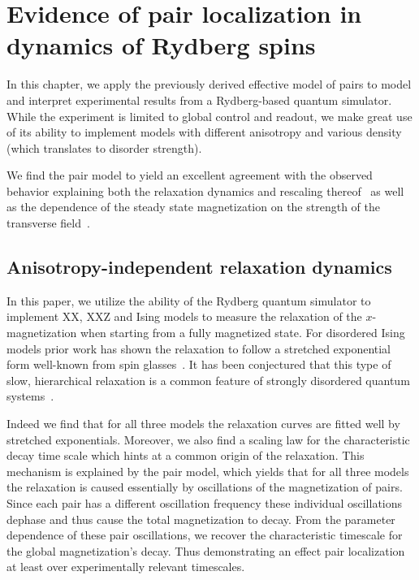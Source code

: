 \chapter{Evidence of pair localization in dynamics of Rydberg spins}

In this chapter, we apply the previously derived effective model of pairs to model and interpret experimental results from a Rydberg-based quantum simulator. While the experiment is limited to global control and readout, we make great use of its ability to implement models with different anisotropy and various density (which translates to disorder strength).

We find the pair model to yield  an excellent agreement with the observed behavior explaining both the relaxation dynamics and rescaling thereof~\cite{franzObservationUniversalRelaxation2023} as well as the dependence of the steady state magnetization on the strength of the transverse field~\cite{franzEmergentPairLocalization2022}.


\section{Anisotropy-independent relaxation dynamics}
In this paper, we utilize the ability of the Rydberg quantum simulator to implement XX, XXZ and Ising models to measure the relaxation of the $x$-magnetization when starting from a fully magnetized state. For disordered Ising models prior work has shown the relaxation to follow a stretched exponential form well-known from spin glasses~\cite{breyStretchedExponentialDecay1993,signolesGlassyDynamicsDisordered2021,schultzenGlassyQuantumDynamics2022,schultzenSemiclassicalSimulationsPredict2022}. It has been conjectured that this type of slow, hierarchical relaxation is a common feature of strongly disordered quantum systems~\cite{haldarSlowDynamicsKohlrausch2023}.

Indeed we find that for all three models the relaxation curves are fitted well by stretched exponentials. Moreover, we also find a scaling law for the characteristic decay time scale which hints at a common origin of the relaxation. This mechanism is explained by the pair model, which yields that for all three models the relaxation is caused essentially by oscillations of the magnetization of pairs. Since each pair has a different oscillation frequency these individual oscillations dephase and thus cause the total magnetization to decay. From the parameter dependence of these pair oscillations, we recover the characteristic timescale for the global magnetization's decay. Thus demonstrating an effect pair localization at least over experimentally relevant timescales.

